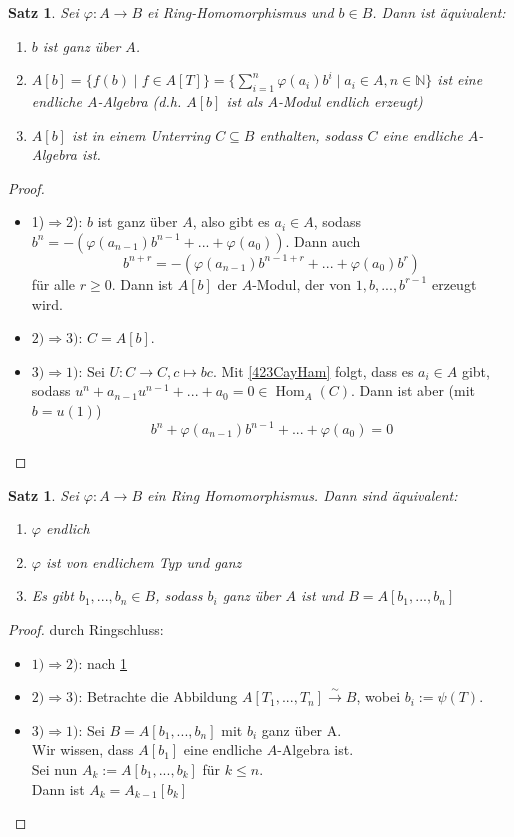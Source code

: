 \documentclass[10pt,a4paper]{article}
\newcommand{\N}{\ensuremath{\mathbb{N}}}
\newcommand{\isomfunc}{\ensuremath{\xrightarrow{\sim}}}
\newcommand{\End}{\operatorname{Hom}}
\newcounter{thm}[section]
\theoremstyle{definition}
\theoremstyle{plain}
\newtheorem{satz}[thm]{Satz}
\theoremstyle{remark}
\begin{document}
\begin{satz}\label{604Satz}
	Sei $\varphi:A\rightarrow B$ ei Ring-Homomorphismus und $b\in B$. Dann ist äquivalent:
	\begin{enumerate}
		\item $b$ ist ganz über $A$.
		\item $A[b]=\{f(b)\mid f\in A[T]\}=\{\sum_{i=1}^{n}\varphi(a_i)b^i\mid a_i\in A,n\in\N \}$ ist eine endliche $A$-Algebra (d.h. $A[b]$ ist als $A$-Modul endlich erzeugt)
		\item $A[b]$ ist in einem Unterring $C\subseteq B$ enthalten, sodass $C$ eine endliche $A$-Algebra ist.
	\end{enumerate}
\end{satz}
\begin{proof}
	\begin{itemize}
		\item 1)$\Rightarrow$2): $b$ ist ganz über $A$, also gibt es $a_i\in A$, sodass $b^n=-(\varphi(a_{n-1})b^{n-1}+...+\varphi(a_0))$. Dann auch
		\[b^{n+r}=-(\varphi(a_{n-1})b^{n-1+r}+...+\varphi(a_0)b^r)\]
		für alle $r\ge 0$. Dann ist $A[b]$ der $A$-Modul, der von $1,b,...,b^{r-1}$ erzeugt wird.
		\item $2)\Rightarrow3)$: $C=A[b]$.
		\item $3)\Rightarrow1)$: Sei $U:C\rightarrow C,c\mapsto bc$. Mit \ref{423CayHam} folgt, dass es $a_i\in A$ gibt, sodass $u^n+a_{n-1}u^{n-1}+...+a_0=0\in\End_A(C)$. Dann ist aber (mit $b=u(1)$)
		\[b^n+\varphi(a_{n-1})b^{n-1}+...+\varphi(a_0)=0\]
	\end{itemize}
\end{proof}

\begin{satz}\label{605Satz}
	Sei $\varphi:A\rightarrow B$ ein Ring Homomorphismus. Dann sind äquivalent:
	\begin{enumerate}
		\item $\varphi$ endlich
		\item $\varphi$ ist von endlichem Typ und ganz
		\item Es gibt $b_1,...,b_n\in B$, sodass $b_i$ ganz über $A$ ist und $B=A[b_1,...,b_n]$
	\end{enumerate}
\end{satz}
\begin{proof} durch Ringschluss:
	\begin{itemize}
		\item $1)\Rightarrow 2)$: nach \ref{604Satz}
		\item $2)\Rightarrow 3)$: Betrachte die Abbildung $A[T_1,...,T_n]\isomfunc B$, wobei $b_i:=\psi(T)$.
		\item $3)\Rightarrow 1)$: Sei $B=A[b_1,...,b_n]$ mit $b_i$ ganz über A.\\
		Wir wissen, dass $A[b_1]$ eine endliche $A$-Algebra ist.\\
		Sei nun $A_k:=A[b_1,...,b_k]$ für $k\leq n$.\\
		Dann ist $A_k=A_{k-1}[b_k]$ 
	\end{itemize}
\end{proof}
\end{document}
